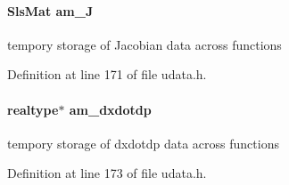\paragraph[{am\+\_\+\+J}]{\setlength{\rightskip}{0pt plus 5cm}Sls\+Mat am\+\_\+\+J}\label{struct_user_data_a822be7d2872832008aa0b7c0282b04f6}
tempory storage of Jacobian data across functions 

Definition at line 171 of file udata.\+h.

\hypertarget{struct_user_data_a04716137a064f7c6d85c04aeb235b4f0}{}
\paragraph[{am\+\_\+dxdotdp}]{\setlength{\rightskip}{0pt plus 5cm}realtype$\ast$ am\+\_\+dxdotdp}\label{struct_user_data_a04716137a064f7c6d85c04aeb235b4f0}
tempory storage of dxdotdp data across functions 

Definition at line 173 of file udata.\+h.


